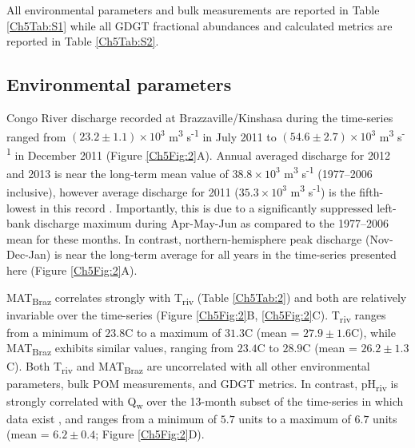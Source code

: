 All environmental parameters and bulk measurements are reported in Table \ref{Ch5Tab:S1} while all GDGT fractional abundances and calculated metrics are reported in Table \ref{Ch5Tab:S2}. 

\subsection{Environmental parameters}

Congo River discharge recorded at Brazzaville/Kinshasa during the time-series ranged from $(23.2 \pm 1.1) \times 10^3$ m\textsuperscript{3} s\textsuperscript{-1} in July 2011 to $(54.6 \pm 2.7) \times 10^3$ m\textsuperscript{3} s\textsuperscript{-1} in December 2011 (Figure \ref{Ch5Fig:2}A). Annual averaged discharge for 2012 and 2013 is near the long-term mean value of $38.8 \times 10^3$ m\textsuperscript{3} s\textsuperscript{-1} (1977--2006 inclusive), however average discharge for 2011 ($35.3 \times 10^3$ m\textsuperscript{3} s\textsuperscript{-1}) is the fifth-lowest in this record \citep{Spencer:2012en}. Importantly, this is due to a significantly suppressed left-bank discharge maximum during Apr-May-Jun as compared to the 1977--2006 mean for these months. In contrast, northern-hemisphere peak discharge (Nov-Dec-Jan) is near the long-term average for all years in the time-series presented here (Figure \ref{Ch5Fig:2}A).

MAT\textsubscript{Braz} correlates strongly with T\textsubscript{riv} (Table \ref{Ch5Tab:2}) and both are relatively invariable over the time-series (Figure \ref{Ch5Fig:2}B, \ref{Ch5Fig:2}C). T\textsubscript{riv} ranges from a minimum of $23.8$\textdegree C to a maximum of $31.3$\textdegree C (mean = $27.9 \pm 1.6$\textdegree C), while MAT\textsubscript{Braz} exhibits similar values, ranging from $23.4$\textdegree C to $28.9$\textdegree C (mean = $26.2 \pm 1.3$\textdegree C). Both T\textsubscript{riv} and MAT\textsubscript{Braz} are uncorrelated with all other environmental parameters, bulk POM measurements, and GDGT metrics. In contrast, pH\textsubscript{riv} is strongly correlated with Q\textsubscript{w} over the 13-month subset of the time-series in which data exist \citep[$r = -0.97$, $p$-value = $1.25 \times 10^{-8}$;][]{Wang:2013js}, and ranges from a minimum of $5.7$ units to a maximum of $6.7$ units (mean = $6.2 \pm 0.4$; Figure \ref{Ch5Fig:2}D).

